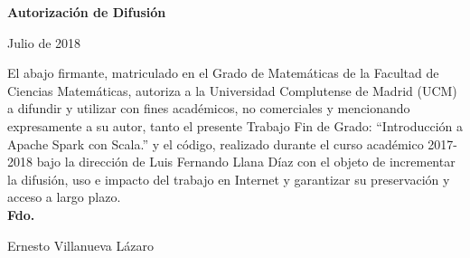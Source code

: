 \thispagestyle{empty}

\begin{titlepage}

\null
\vfill


\begin{center}
\textbf{Autorización de Difusión}\\
\end{center}


\begin{center}
Julio de 2018
\end{center}
El abajo firmante, matriculado en el Grado de Matemáticas de la Facultad de
Ciencias Matemáticas, autoriza a la Universidad Complutense de Madrid (UCM) a difundir y
utilizar con fines académicos, no comerciales y mencionando expresamente a su autor, tanto  el presente Trabajo Fin de Grado: “Introducción a Apache Spark con Scala.” y el código, realizado durante el curso académico 2017-2018 bajo la dirección de Luis Fernando Llana Díaz con el objeto de incrementar la difusión, uso e impacto del trabajo en Internet y garantizar su preservación y acceso a largo plazo.\\


\textbf{Fdo.}

\begin{center}
Ernesto Villanueva Lázaro

\end{center}

\vfill\null

\end{titlepage}

\thispagestyle{empty}